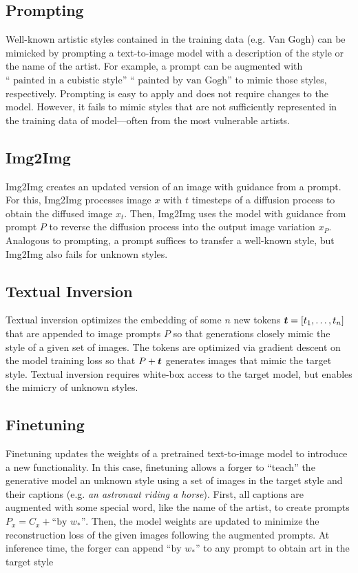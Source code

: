 \documentclass{article}
\newcommand{\token}[1]{#1}
\newcommand{\word}[1]{#1_*}
\begin{document}
\subsection{Prompting}
\label{sec:prompting}

Well-known artistic styles contained in the training data (e.g. Van Gogh) can be mimicked by prompting a text-to-image model with a description of the style or the name of the artist.
For example, a prompt can be augmented with $\textrm{`` painted in a cubistic style''}$ $\textrm{`` painted by van Gogh''}$ to mimic those styles, respectively. Prompting is easy to apply and does not require changes to the model. However, it fails to mimic styles that are not sufficiently represented in the training data of model---often from the most vulnerable artists.

\subsection{Img2Img}
\label{sec:mimicimg2img}

Img2Img creates an updated version of an image with guidance from a prompt. For this, Img2Img processes image $x$ with $t$ timesteps of a diffusion process to obtain the diffused image $x_t$. Then, Img2Img uses the model with guidance from prompt $P$ to reverse the diffusion process into the output image variation $x_P$.
Analogous to prompting, a prompt suffices to transfer a well-known style, but Img2Img also fails for unknown styles.

\subsection{Textual Inversion}

Textual inversion \citep{textualinversion} optimizes the embedding of some $n$ new tokens $\vt = \bracket{\token{t}_1,\ldots, \token{t}_n}$ that are appended to image prompts $P$ so that generations closely mimic the style of a given set of images. The tokens are optimized via gradient descent on the model training loss so that $P + {\bm{t}}$ generates images that mimic the target style. Textual inversion requires white-box access to the target model, but enables the mimicry of unknown styles.

\subsection{Finetuning}
\label{sec:finetuning}

Finetuning updates the weights of a pretrained text-to-image model to introduce a new functionality. In this case, finetuning allows a forger to ``teach'' the generative model an unknown style using a set of images in the target style and their captions (e.g. \emph{an astronaut riding a horse}). First, all captions are augmented with some special word, like the name of the artist, to create prompts $P_x = C_x + \textrm{``by }\word{w}\textrm{''}$. Then, the model weights are updated to minimize the reconstruction loss of the given images following the augmented prompts. At inference time, the forger can append $\textrm{``by }\word{w}\textrm{''}$ to any prompt to obtain art in the target style
\end{document}
